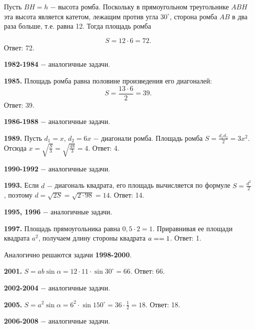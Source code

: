 Пусть $BH = h$ $-$ высота ромба. Поскольку в прямоугольном треугольнике $ABH$ эта высота является катетом, лежащим против угла $30^\circ$, сторона ромба $AB$ в два раза больше, т.е. равна 12. Тогда площадь ромба

\[
S = 12 \cdot 6 = 72.
\]
\null \hspace*{\fill} Ответ: 72.

\textbf{1982-1984} $-$ аналогичные задачи.

\textbf{1985.} Площадь ромба равна половине произведения его диагоналей:
\[
S = \frac{13\cdot6}{2}=39.
\]
\null \hspace*{\fill} Ответ: 39.

\textbf{1986-1988} $-$ аналогичные задачи.

\textbf{1989.} Пусть $d_1=x$, $d_2=6x$ $-$ диагонали ромба. Площадь ромба $S = \frac{d_1d_2}{2}=3x^2$. Отсюда $x = \sqrt{\frac{S}{3}} = \sqrt{\frac{48}{3}}=4$. \newline \null \hspace*{\fill} Ответ: 4.

\textbf{1990-1992} $-$ аналогичные задачи.

\textbf{1993.}  Если $d$ $-$ диагональ квадрата, его площадь вычисляется по формуле $S = \frac{d^2}{2}$, поэтому $d = \sqrt{2S} = \sqrt{2\cdot98}=14.$ \newline \null \hspace*{\fill} Ответ: 14.

\textbf{1995, 1996} $-$ аналогичные задачи.

\textbf{1997.} Площадь прямоугольника равна $0,5\cdot2=1$.  Приравнивая ее площади квадрата $a^2$, получаем длину стороны квадрата $a=\linebreak=1$.
\newline \null \hspace*{\fill} Ответ: 1.

Аналогично решаются задачи \textbf{1998-2000}.

\textbf{2001.} $S = ab\sin{\alpha}=12\cdot11\cdot\sin{30^\circ}=66.$ \newline \null \hspace*{\fill} Ответ: 66.

\textbf{2002-2004} $-$ аналогичные задачи.

\textbf{2005.} $S = a^2\sin{\alpha}=6^2\cdot\sin{150^\circ}=36\cdot\frac{1}{2}=18.$ \newline \null \hspace*{\fill} Ответ: 18.

\textbf{2006-2008} $-$ аналогичные задачи.

